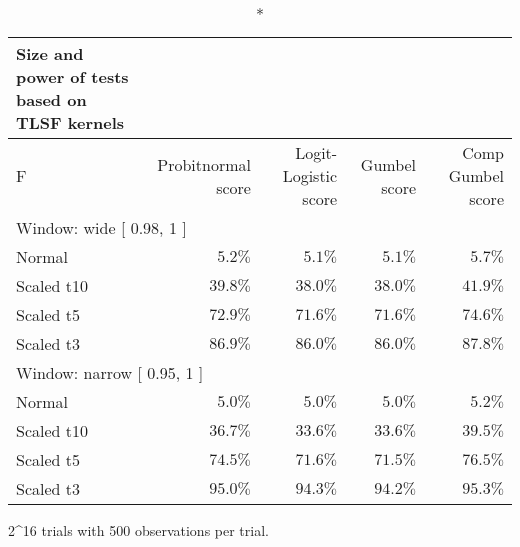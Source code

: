 \setlength{\LTpost}{0mm}
\begin{longtable}{lrrrr}
\caption*{
{\large Size and power of tests based on TLSF kernels}
} \\ 
\toprule
F & Probitnormal score & Logit-Logistic score & Gumbel score & Comp Gumbel score \\ 
\midrule
\multicolumn{5}{l}{Window:  wide  [ 0.98, 1 ]} \\ 
\midrule
Normal & $5.2\%$ & $5.1\%$ & $5.1\%$ & $5.7\%$ \\ 
Scaled t10 & $39.8\%$ & $38.0\%$ & $38.0\%$ & $41.9\%$ \\ 
Scaled t5 & $72.9\%$ & $71.6\%$ & $71.6\%$ & $74.6\%$ \\ 
Scaled t3 & $86.9\%$ & $86.0\%$ & $86.0\%$ & $87.8\%$ \\ 
\midrule
\multicolumn{5}{l}{Window:  narrow  [ 0.95, 1 ]} \\ 
\midrule
Normal & $5.0\%$ & $5.0\%$ & $5.0\%$ & $5.2\%$ \\ 
Scaled t10 & $36.7\%$ & $33.6\%$ & $33.6\%$ & $39.5\%$ \\ 
Scaled t5 & $74.5\%$ & $71.6\%$ & $71.5\%$ & $76.5\%$ \\ 
Scaled t3 & $95.0\%$ & $94.3\%$ & $94.2\%$ & $95.3\%$ \\ 
\bottomrule
\end{longtable}
\begin{minipage}{\linewidth}
2\textasciicircum{}16 trials with 500 observations per trial.\\
\end{minipage}

